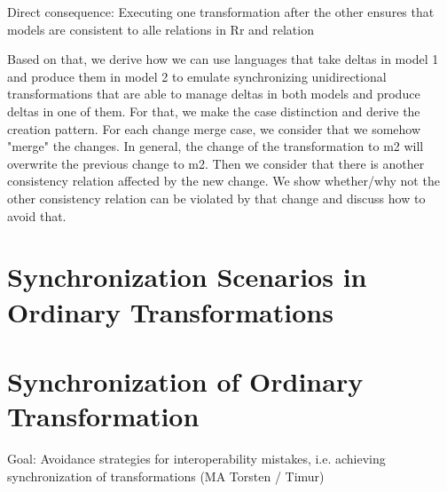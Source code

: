 Direct consequence: Executing one transformation after the other ensures that models are consistent to alle relations in Rr and relation

Based on that, we derive how we can use languages that take deltas in model 1 and produce them in model 2 to emulate synchronizing unidirectional transformations that are able to manage deltas in both models and produce deltas in one of them.
For that, we make the case distinction and derive the creation pattern.
For each change merge case, we consider that we somehow "merge" the changes. In general, the change of the transformation to m2 will overwrite the previous change to m2. Then we consider that there is another consistency relation affected by the new change. We show whether/why not the other consistency relation can be violated by that change and discuss how to avoid that.




\section{Synchronization Scenarios in Ordinary Transformations}





\section{Synchronization of Ordinary Transformation}
Goal: Avoidance strategies for interoperability mistakes, i.e. achieving synchronization of transformations (MA Torsten / Timur)
\label{chap:prevention:interoperability}

